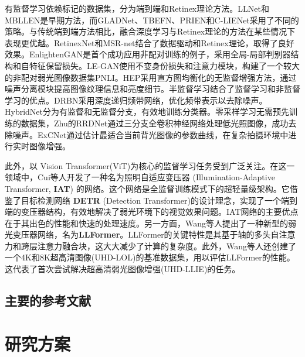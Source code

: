 \documentclass[a4paper]{ctexart}
\begin{document}
	有监督学习依赖标记的数据集，分为端到端和Retinex理论方法。LLNet和MBLLEN\cite{lv2018mbllen}是早期方法，而GLADNet\cite{wang2018gladnet}、TBEFN\cite{lu2020tbefn}、PRIEN\cite{li2021low}和C-LIENet\cite{ravirathinam2021c}采用了不同的策略。与传统端到端方法相比，融合深度学习与Retinex理论的方法在某些情况下表现更优越。RetinexNet\cite{wei2018deep}和MSR-net\cite{shen2017msr}结合了数据驱动和Retinex理论，取得了良好效果。EnlightenGAN\cite{jiang2021enlightengan}是首个成功应用非配对训练的例子，采用全局-局部判别器结构和自特征保留损失。LE-GAN\cite{fu2022gan}使用不变身份损失和注意力模块，构建了一个较大的非配对弱光图像数据集PNLI。HEP\cite{zhang2021unsupervised}采用直方图均衡化的无监督增强方法，通过噪声分离模块提高图像纹理信息和亮度细节。半监督学习结合了监督学习和非监督学习的优点。DRBN\cite{qiao2021deep}采用深度递归频带网络，优化频带表示以去除噪声。HybridNet\cite{robert2018hybridnet}分为有监督和无监督分支，有效地训练分类器。零采样学习无需预先训练的数据集，Zhu\cite{zhu2020zero}的RRDNet通过三分支全卷积神经网络处理低光照图像，成功去除噪声。ExCNet\cite{zhang2019zero}通过估计最适合当前背光图像的参数曲线，在复杂拍摄环境中进行实时图像增强。
	
	此外，以 Vision Transformer(ViT)\cite{dosovitskiy2020image}为核心的监督学习任务受到广泛关注。在这一领域中，Cui等人\cite{cui2022illumination}开发了一种名为照明自适应变压器 (Illumination-Adaptive Transformer, \textbf{IAT}) 的网络。这个网络是全监督训练模式下的超轻量级架构。它借鉴了目标检测网络 \textbf{DETR} (Detection Transformer)的设计理念\cite{carion2020end}，实现了一个端到端的变压器结构，有效地解决了弱光环境下的视觉效果问题。IAT网络的主要优点在于其出色的性能和快速的处理速度。另一方面，Wang等人\cite{wang2023ultra}提出了一种新型的弱光变压器网络，名为\textbf{LLFormer}。LLFormer的关键特性是其基于轴的多头自注意力和跨层注意力融合块，这大大减少了计算的复杂度。此外，Wang等人还创建了一个4K和8K超高清图像(UHD-LOL)的基准数据集，用以评估LLFormer的性能。这代表了首次尝试解决超高清弱光图像增强(UHD-LLIE)的任务。
	
	\subsection{主要的参考文献}
	
	\renewcommand{\refname}{}
	
	\vspace{-1cm}
	
	
	
	
	\section{研究方案}
	
\end{document}
